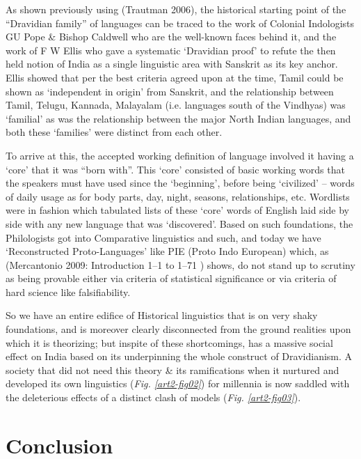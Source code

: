 As shown previously using (Trautman 2006), the historical starting point of the “Dravidian family” of languages can be traced to the work of Colonial Indologists GU Pope \& Bishop Caldwell who are the well-known faces behind it, and the work of F W Ellis who gave a systematic ‘Dravidian proof’ to refute the then held notion of India as a single linguistic area with Sanskrit as its key anchor. Ellis showed that per the best criteria agreed upon at the time, Tamil could be shown as ‘independent in origin’ from Sanskrit, and the relationship between Tamil, Telugu, Kannada, Malayalam (i.e. languages south of the Vindhyas) was ‘familial’ as was the relationship between the major North Indian languages, and both these ‘families’ were distinct from each other.

To arrive at this, the accepted working definition of language involved it having a ‘core’ that it was “born with”. This ‘core’ consisted of basic working words that the speakers must have used since the ‘beginning’, before being ‘civilized’ – words of daily usage as for body parts, day, night, seasons, relationships, etc. Wordlists were in fashion which tabulated lists of these ‘core’ words of English laid side by side with any new language that was ‘discovered’. Based on such foundations, the Philologists got into Comparative linguistics and such, and today we have ‘Reconstructed Proto-Languages’ like PIE (Proto Indo European) which, as (Mercantonio 2009: Introduction 1–1 to 1–71 ) shows, do not stand up to scrutiny as being provable either via criteria of statistical significance or via criteria of hard science like falsifiability.

So we have an entire edifice of Historical linguistics that is on very shaky foundations, and is moreover clearly disconnected from the ground realities upon which it is theorizing; but inspite of these shortcomings, has a massive social effect on India based on its underpinning the whole construct of Dravidianism. A society that did not need this theory \& its ramifications when it nurtured and developed its own linguistics (\textit{Fig. \ref{art2-fig02}}) for millennia is now saddled with the deleterious effects of a distinct clash of models (\textit{Fig. \ref{art2-fig03}}).



\section*{Conclusion}

